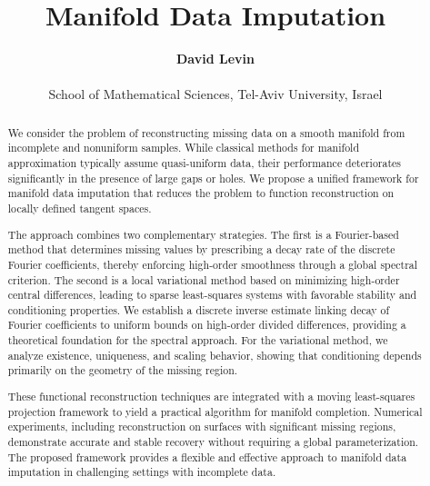 \documentclass[11pt,oneside,reqno]{amsart}
\theoremstyle{plain}
\numberwithin{equation}{section}
\begin{document}
\title{Manifold Data Imputation}
\author{{\bf David Levin}\\ \\School of Mathematical Sciences, Tel-Aviv University, Israel}
\begin{abstract}
We consider the problem of reconstructing missing data on a smooth manifold from
incomplete and nonuniform samples. While classical methods for manifold approximation
typically assume quasi-uniform data, their performance deteriorates significantly in the presence of
large gaps or holes. We propose a unified framework for manifold data imputation that
reduces the problem to function reconstruction on locally defined tangent spaces.

The approach combines two complementary strategies. The first is a Fourier-based method
that determines missing values by prescribing a decay rate of the discrete Fourier
coefficients, thereby enforcing high-order smoothness through a global spectral
criterion. The second is a local variational method based on minimizing high-order
central differences, leading to sparse least-squares systems with favorable stability
and conditioning properties. We establish a discrete inverse estimate linking decay of
Fourier coefficients to uniform bounds on high-order divided differences, providing a
theoretical foundation for the spectral approach. For the variational method, we analyze
existence, uniqueness, and scaling behavior, showing that conditioning depends primarily
on the geometry of the missing region.

These functional reconstruction techniques are integrated with a moving least-squares
projection framework to yield a practical algorithm for manifold completion. Numerical
experiments, including reconstruction on surfaces with significant missing regions,
demonstrate accurate and stable recovery without requiring a global parameterization.
The proposed framework provides a flexible and effective approach to manifold data
imputation in challenging settings with incomplete data.
\end{abstract}
\maketitle
\end{document}
